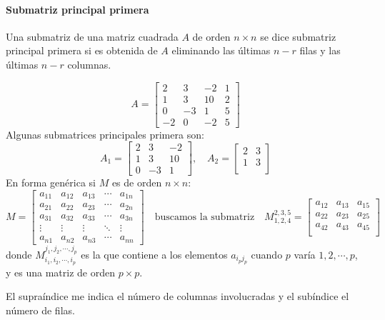 \paragraph{Submatriz principal primera}

Una submatriz de una matriz cuadrada \(A\) de orden \(n \times n\) se dice submatriz principal primera si es obtenida de \(A\) eliminando las últimas \(n-r\) filas y las últimas \(n-r\) columnas.

\[
A = \begin{bmatrix}
  2 & 3 & -2 & 1\\
  1 & 3 & 10 & 2\\
  0 & -3 & 1 & 5\\
  -2 & 0 & -2& 5
\end{bmatrix}
\]
Algunas submatrices principales primera son:
\[
A_1 = \begin{bmatrix}
  2 & 3 & -2 \\
  1 & 3 & 10\\
  0 & -3 & 1
\end{bmatrix}, \quad A_2 = \begin{bmatrix}
  2 & 3\\
  1 & 3\\
\end{bmatrix}
\]
En forma genérica si \(M\) es de orden \(n\times n\):
\[
M = \begin{bmatrix}
  a_{11} & a_{12} & a_{13} & \cdots & a_{1n}\\
  a_{21} & a_{22} & a_{23} & \cdots & a_{2n}\\
  a_{31} & a_{32} & a_{33} & \cdots & a_{3n}\\
  \vdots & \vdots & \vdots & \ddots & \vdots \\
  a_{n1} & a_{n2} & a_{n3} & \cdots & a_{nn}
\end{bmatrix} \quad \text{buscamos la submatriz} \quad M^{2,3,5}_{1,2,4}= \begin{bmatrix}
  a_{12} & a_{13} & a_{15}\\
  a_{22} & a_{23} & a_{25}\\
  a_{42} & a_{43} & a_{45}\\  
\end{bmatrix}
\]
donde \(M^{j_1,j_2,\cdots,j_p}_{i_1,i_2,\cdots,i_p}\) es la que contiene a los elementos \(a_{i_p j_p}\) cuando \(p\) varía \(1,2,\cdots,p\), y es una matriz de orden \(p\times p\).

El supraíndice me indica el número de columnas involucradas y el subíndice el número de filas.

